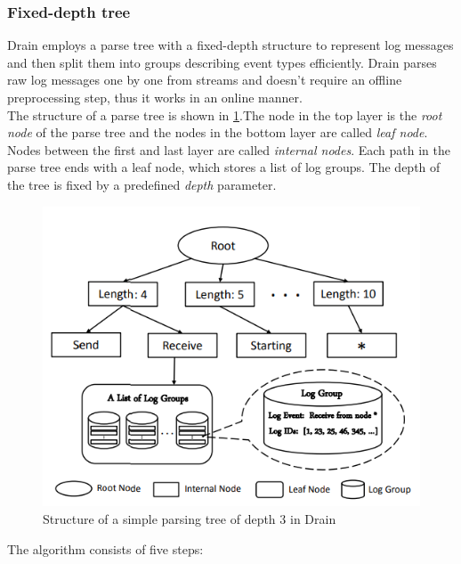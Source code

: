     \subsubsection*{Fixed-depth tree}
    Drain \cite{drain2017} employs a parse tree with a fixed-depth structure to represent log messages and then split them into groups describing event types efficiently. Drain parses raw log messages one by one from streams and doesn't require an offline preprocessing step, thus it works in an online manner.\\
    The structure of a parse tree is shown in \ref{parseTreeDrain}.The node in the top layer is the \textit{root node} of the parse tree and the nodes in the bottom layer are called \textit{leaf node}. Nodes between the first and last layer are called \textit{internal nodes}. 
    Each path in the parse tree ends with a leaf node, which stores a list of log groups. The depth of the tree is fixed by a predefined \textit{depth} parameter. 
    
        \begin{figure}[htbp]
            \centerline{\includegraphics[scale=.5]{img/parse-tree-drain.PNG}}
            \caption{Structure of a simple parsing tree of depth $3$ in Drain \cite{drain2017}}
            \label{parseTreeDrain}
        \end{figure}
        
    The algorithm consists of five steps: 
    
